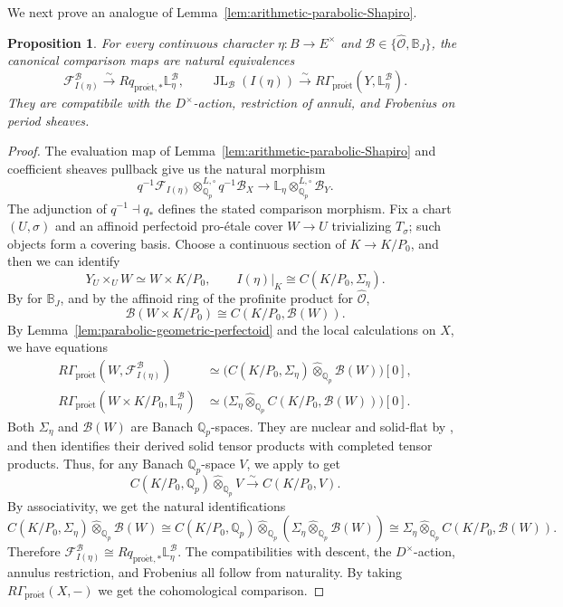 \documentclass[11pt]{article}
\newtheorem{proposition}[theorem]{Proposition}
\theoremstyle{definition}
\newcommand{\Qp}{\mathbb Q_p}
\newcommand{\cF}{\mathcal F}
\newcommand{\proet}{\mathrm{pro\acute et}}
\newcommand{\JL}{\operatorname{JL}}
\begin{document}
We next prove an analogue of Lemma~\ref{lem:arithmetic-parabolic-Shapiro}.
\begin{proposition}
\label{prop:parabolic-geometric-Shapiro}
For every continuous character \(\eta:B\to E^\times\) and
\(\mathscr B\in\{\widehat{\mathscr O},\mathbb B_J\}\), the
canonical comparison maps are natural equivalences
\begin{equation*}
 \cF_{I(\eta)}^{\mathscr B}
 \xrightarrow{\sim}Rq_{\proet,*}\mathbb L_\eta^{\mathscr B},
 \qquad
 \JL_{\mathscr B}(I(\eta))
 \xrightarrow{\sim}R\Gamma_{\proet}(Y,\mathbb L_\eta^{\mathscr B}).
\end{equation*}
They are compatibile with the \(D^\times\)-action, 
restriction of annuli, and Frobenius on period sheaves.
\end{proposition}
\begin{proof}
The evaluation map of Lemma~\ref{lem:arithmetic-parabolic-Shapiro}
and coefficient sheaves pullback give us the natural morphism
\[
 q^{-1}\cF_{I(\eta)}\otimes_{\Qp}^{L,\square}q^{-1}\mathscr B_X
 \longrightarrow
 \mathbb L_\eta\otimes_{\Qp}^{L,\square}\mathscr B_Y.
\]
The adjunction of $q^{-1}\dashv q_*$ defines the stated comparison morphism.  Fix a chart $(U,\sigma)$
and an affinoid perfectoid pro-\'etale cover $W\to U$
trivializing $T_\sigma$; such objects form a covering basis.  
Choose a continuous section of $K\to K/P_0$, and then we can identify
\[
 Y_U\times_UW\simeq W\times K/P_0,\qquad
 I(\eta)|_K\cong C(K/P_0,\Sigma_\eta).
\]
By \cite[Corollary~4.10]{BoscoDrinfeld} for $\mathbb{B}_J$, and by
the affinoid ring of the profinite product for
$\widehat{\mathscr O}$,
\[
 \mathscr B(W\times K/P_0)\cong C(K/P_0,\mathscr B(W)).
\]
By Lemma~\ref{lem:parabolic-geometric-perfectoid} and the local calculations on $X$, we have equations
\begin{align*}
 R\Gamma_{\proet}(W,\cF_{I(\eta)}^{\mathscr B})
 &\simeq\bigl(C(K/P_0,\Sigma_\eta)\widehat\otimes_{\Qp}\mathscr B(W)\bigr)[0],\\
 R\Gamma_{\proet}(W\times K/P_0,\mathbb L_\eta^{\mathscr B})
 &\simeq\bigl(\Sigma_\eta\widehat\otimes_{\Qp}C(K/P_0,\mathscr B(W))\bigr)[0].
\end{align*}
Both $\Sigma_\eta$ and $\mathscr B(W)$ are Banach $\Qp$-spaces.
They are nuclear and solid-flat by
\cite[Corollary~A.61]{BoscoDrinfeld}, and then
\cite[Proposition~A.68]{BoscoDrinfeld} identifies their derived
solid tensor products with completed tensor products.
Thus, for any Banach $\Qp$-space $V$, we apply
\cite[Proposition~A.55(i)]{BoscoDrinfeld} to get
\[
 C(K/P_0,\Qp)\widehat\otimes_{\Qp}V
 \xrightarrow{\sim}C(K/P_0,V).
\]
By associativity, we get the natural identifications
\[
 C(K/P_0,\Sigma_\eta)\widehat\otimes_{\Qp}\mathscr B(W)
 \cong C(K/P_0,\Qp)\widehat{\otimes}_{\Qp}(\Sigma_\eta\widehat\otimes_{\Qp}\mathscr B(W))
 \cong\Sigma_\eta\widehat\otimes_{\Qp}C(K/P_0,\mathscr B(W)).
\]
Therefore \(\cF_{I(\eta)}^{\mathscr B}\cong Rq_{\proet,*}\mathbb{L}_\eta^{\mathscr{B}}.\)
The compatibilities with descent, the $D^\times$-action,
annulus restriction, and Frobenius all follow from naturality.  
By taking $R\Gamma_{\proet}(X,-)$ we get the cohomological comparison.
\end{proof}
\end{document}
